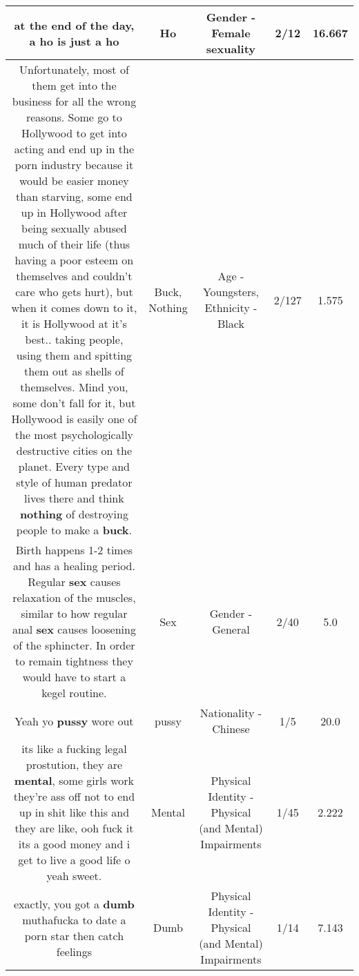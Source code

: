\documentclass[11pt]{article}
\newlength\mylength
\begin{document}
\begin{center}
\begin{longtable}{|C{.65\mylength}|C{.30\mylength}|C{.12\mylength}|C{.12\mylength}|C{.12\mylength}|}
  \small at the end of the day, a \textbf{ho} is just a ho\normalsize   & Ho & Gender - Female sexuality & 2/12 & 16.667 \\  \hline
  \small Unfortunately, most of them get into the business for all the wrong reasons. Some go to Hollywood to get into acting and end up in the porn industry because it would be easier money than starving, some end up in Hollywood after being sexually abused much of their life (thus having a poor esteem on themselves and couldn't care who gets hurt), but when it comes down to it, it is Hollywood at it's best.. taking people, using them and spitting them out as shells of themselves. Mind you, some don't fall for it, but Hollywood is easily one of the most psychologically destructive cities on the planet. Every type and style of human predator lives there and think \textbf{nothing} of destroying people to make a \textbf{buck}.\normalsize   & Buck, Nothing & Age - Youngsters, Ethnicity - Black & 2/127 & 1.575 \\  \hline
  \small Birth happens 1-2 times and has a healing period. Regular \textbf{sex} causes relaxation of the muscles, similar to how regular anal \textbf{sex} causes loosening of the sphincter. In order to remain tightness they would have to start a kegel routine.\normalsize   & Sex & Gender - General & 2/40 & 5.0 \\  \hline
  \small Yeah yo \textbf{pussy} wore out\normalsize   & pussy & Nationality - Chinese & 1/5 & 20.0 \\  \hline
  \small its like a fucking legal prostution, they are \textbf{mental}, some girls work they're ass off not to end up in shit like this and they are like, ooh fuck it its a good money and i get to live a good life o yeah sweet.\normalsize   & Mental & Physical Identity - Physical (and Mental) Impairments & 1/45 & 2.222 \\  \hline
  \small exactly, you got a \textbf{dumb} muthafucka to date a porn star then catch feelings\normalsize   & Dumb & Physical Identity - Physical (and Mental) Impairments & 1/14 & 7.143 \\  \hline

\end{longtable}
\end{center}
\end{document}
